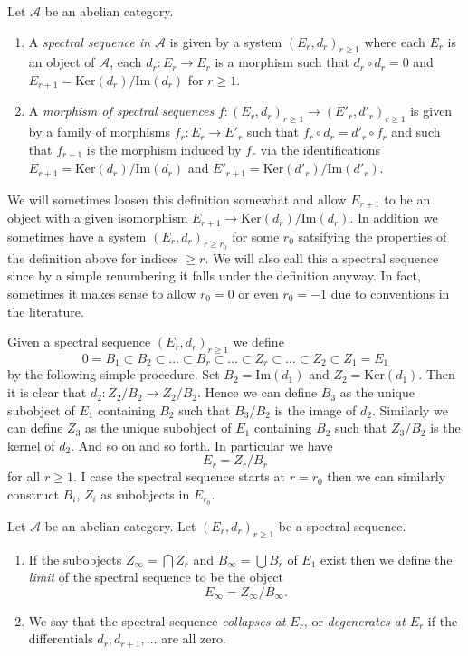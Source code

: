 \begin{definition}
\label{definition-spectral-sequence}
Let $\mathcal{A}$ be an abelian category.
\begin{enumerate}
\item A {\it spectral sequence in $\mathcal{A}$} is given by a
system $(E_r, d_r)_{r \geq 1}$ where each $E_r$ is an object
of $\mathcal{A}$, each $d_r : E_r \to E_r$ is a morphism such
that $d_r \circ d_r = 0$ and $E_{r + 1} = \text{Ker}(d_r)/\text{Im}(d_r)$
for $r \geq 1$.
\item A {\it morphism of spectral sequences}
$f : (E_r, d_r)_{r \geq 1} \to (E'_r, d'_r)_{r \geq 1}$ is
given by a family of morphisms $f_r : E_r \to E'_r$ such that
$f_r \circ d_r = d'_r \circ f_r$ and such that $f_{r + 1}$
is the morphism induced by $f_r$ via the identifications
$E_{r + 1} = \text{Ker}(d_r)/\text{Im}(d_r)$
and
$E'_{r + 1} = \text{Ker}(d'_r)/\text{Im}(d'_r)$.
\end{enumerate}
\end{definition}

\noindent
We will sometimes loosen this definition somewhat and allow $E_{r + 1}$
to be an object with a given isomorphism
$E_{r + 1} \to \text{Ker}(d_r)/\text{Im}(d_r)$.
In addition we sometimes have a system $(E_r, d_r)_{r \geq r_0}$
for some $r_0$ satsifying the properties of the definition above
for indices $\geq r$. We will also call this a spectral sequence since by
a simple renumbering it falls under the definition anyway.
In fact, sometimes it makes sense to allow $r_0 = 0$ or even $r_0 = -1$
due to conventions in the literature.

\medskip\noindent
Given a spectral sequence $(E_r, d_r)_{r \geq 1}$ we define
$$
0 = B_1 \subset B_2 \subset \ldots \subset B_r \subset \ldots
\subset Z_r \subset \ldots \subset Z_2 \subset Z_1 = E_1
$$
by the following simple procedure. Set $B_2 = \text{Im}(d_1)$
and $Z_2 = \text{Ker}(d_1)$. Then it is clear that
$d_2 : Z_2/B_2 \to Z_2/B_2$. Hence we can define $B_3$ as the unique
subobject of $E_1$ containing $B_2$ such that $B_3/B_2$ is the image
of $d_2$. Similarly we can define $Z_3$ as the unique subobject of
$E_1$ containing $B_2$ such that $Z_3/B_2$ is the kernel of $d_2$.
And so on and so forth. In particular we have
$$
E_r = Z_r/B_r
$$
for all $r \geq 1$. I case the spectral sequence starts at $r = r_0$
then we can similarly construct $B_i$, $Z_i$ as subobjects in $E_{r_0}$.

\begin{definition}
\label{definition-limit-spectral-sequence}
Let $\mathcal{A}$ be an abelian category.
Let $(E_r, d_r)_{r \geq 1}$ be a spectral sequence.
\begin{enumerate}
\item If the subobjects $Z_{\infty} = \bigcap Z_r$
and $B_{\infty} = \bigcup B_r$ of $E_1$ exist then we define
the {\it limit} of the spectral sequence to be the object
$$
E_{\infty} = Z_{\infty}/B_{\infty}.
$$
\item We say that the spectral sequence {\it collapses at $E_r$}, or
{\it degenerates at $E_r$} if the differentials $d_r, d_{r + 1}, \ldots$ are
all zero.
\end{enumerate}
\end{definition}

